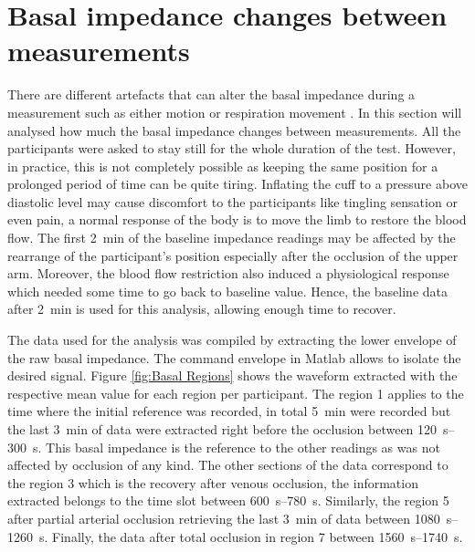 \section{Basal impedance changes between measurements}
\label{senction basal 3}
There are different artefacts that can alter the basal impedance during a measurement such as either motion or respiration movement \cite{pandey2006cancellation, swanson1983errors, ansari2010impedance, rosell1995reduction}. In this section will analysed how much the basal impedance changes between measurements. All the participants were asked to stay still for the whole duration of the test. However, in practice, this is not completely possible as keeping the same position for a prolonged period of time can be quite tiring. Inflating the cuff to a pressure above diastolic level may cause discomfort to the participants like tingling sensation or even pain, a normal response of the body is to move the limb to restore the blood flow. The first \SI{2}{\minute} of the baseline impedance readings may be affected by the rearrange of the participant's position especially after the occlusion of the upper arm. Moreover, the blood flow restriction also induced a physiological response which needed some time to go back to baseline value. Hence, the baseline data after \SI{2}{\minute} is used for this analysis, allowing enough time to recover. 

The data used for the analysis was compiled by extracting the lower envelope of the raw basal impedance. The command envelope in Matlab \cite{MATLAB:2016} allows to isolate the desired signal. Figure \ref{fig:Basal Regions} shows the waveform extracted with the respective mean value for each region per participant. The region 1 applies to the time where the initial reference was recorded, in total \SI{5}{\minute} were recorded but the last \SI{3}{\minute} of data were extracted right before the occlusion between \SIrange{120}{300}{\second}. This basal impedance is the reference to the other readings as was not affected by occlusion of any kind. The other sections of the data correspond to the region 3 which is the recovery after venous occlusion, the information extracted belongs to the time slot between \SIrange{ 600}{780}{\second}.  Similarly, the region 5 after partial arterial occlusion retrieving the last \SI{3}{\minute} of data between \SIrange{1080}{1260}{\second}. Finally, the data after total occlusion in region 7 between \SIrange{1560}{1740}{\second}.

